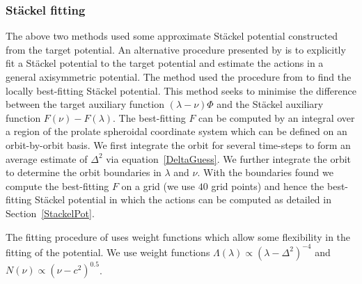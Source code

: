 \documentclass[useAMS,usenatbib,fleqn,a4paper]{mn2e}
\begin{document}
\subsubsection{St\"ackel fitting}\label{Method::FIT}
The above two methods used some approximate St\"ackel potential constructed from the target potential. An alternative procedure presented by \cite{Sanders2012a} is to explicitly fit a St\"ackel potential to the target potential and estimate the actions in a general axisymmetric potential. The method used the procedure from \cite{DejonghedeZeeuw1988} to find the locally best-fitting St\"ackel potential. This method seeks to minimise the difference between the target auxiliary function $(\lambda-\nu)\Phi$ and the St\"ackel auxiliary function $F(\nu)-F(\lambda)$. The best-fitting $F$ can be computed by an integral over a region of the prolate spheroidal coordinate system which can be defined on an orbit-by-orbit basis. We first integrate the orbit for several time-steps to form an average estimate of $\Delta^2$ via equation~\eqref{DeltaGuess}. We further integrate the orbit to determine the orbit boundaries in $\lambda$ and $\nu$. With the boundaries found we compute the best-fitting $F$ on a grid (we use $40$ grid points) and hence the best-fitting St\"ackel potential in which the actions can be computed as detailed in Section~\ref{StackelPot}.

The fitting procedure of \cite{DejonghedeZeeuw1988} uses weight functions which allow some flexibility in the fitting of the potential. We use weight functions $\Lambda(\lambda)\propto (\lambda-\Delta^2)^{-4}$ and $N(\nu)\propto (\nu-c^2)^0.5$.
\end{document}
